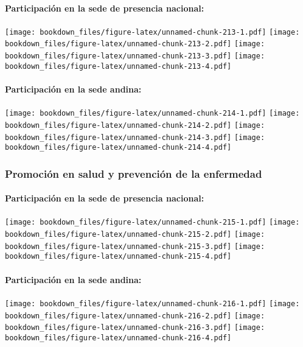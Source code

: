 \documentclass[]{article}
\let\oldparagraph\paragraph
\renewcommand{\paragraph}[1]{\oldparagraph{#1}\mbox{}}
\theoremstyle{definition}
\theoremstyle{definition}
\theoremstyle{definition}
\theoremstyle{remark}
\begin{document}
\paragraph{Participación en la sede de presencia
nacional:}\label{participacion-en-la-sede-de-presencia-nacional-19}

\texttt{[image: bookdown\_files/figure-latex/unnamed-chunk-213-1.pdf]}
\texttt{[image: bookdown\_files/figure-latex/unnamed-chunk-213-2.pdf]}
\texttt{[image: bookdown\_files/figure-latex/unnamed-chunk-213-3.pdf]}
\texttt{[image: bookdown\_files/figure-latex/unnamed-chunk-213-4.pdf]}

\paragraph{Participación en la sede
andina:}\label{participacion-en-la-sede-andina-19}

\texttt{[image: bookdown\_files/figure-latex/unnamed-chunk-214-1.pdf]}
\texttt{[image: bookdown\_files/figure-latex/unnamed-chunk-214-2.pdf]}
\texttt{[image: bookdown\_files/figure-latex/unnamed-chunk-214-3.pdf]}
\texttt{[image: bookdown\_files/figure-latex/unnamed-chunk-214-4.pdf]}

\subsubsection{Promoción en salud y prevención de la
enfermedad}\label{promocion-en-salud-y-prevencion-de-la-enfermedad}

\paragraph{Participación en la sede de presencia
nacional:}\label{participacion-en-la-sede-de-presencia-nacional-20}

\texttt{[image: bookdown\_files/figure-latex/unnamed-chunk-215-1.pdf]}
\texttt{[image: bookdown\_files/figure-latex/unnamed-chunk-215-2.pdf]}
\texttt{[image: bookdown\_files/figure-latex/unnamed-chunk-215-3.pdf]}
\texttt{[image: bookdown\_files/figure-latex/unnamed-chunk-215-4.pdf]}

\paragraph{Participación en la sede
andina:}\label{participacion-en-la-sede-andina-20}

\texttt{[image: bookdown\_files/figure-latex/unnamed-chunk-216-1.pdf]}
\texttt{[image: bookdown\_files/figure-latex/unnamed-chunk-216-2.pdf]}
\texttt{[image: bookdown\_files/figure-latex/unnamed-chunk-216-3.pdf]}
\texttt{[image: bookdown\_files/figure-latex/unnamed-chunk-216-4.pdf]}
\end{document}
